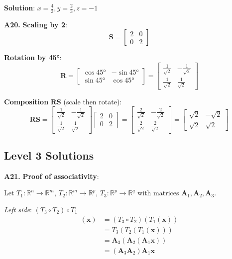 \documentclass[12pt,a4paper]{article}
\theoremstyle{definition}
\begin{document}
\textbf{Solution}: $x = \frac{4}{3}, y = \frac{2}{3}, z = -1$

\textbf{A20.} \textbf{Scaling by 2}:
\[
\mathbf{S} = \begin{bmatrix} 2 & 0 \\ 0 & 2 \end{bmatrix}
\]

\textbf{Rotation by 45°}:
\[
\mathbf{R} = \begin{bmatrix} \cos 45° & -\sin 45° \\ \sin 45° & \cos 45° \end{bmatrix} = \begin{bmatrix} \frac{1}{\sqrt{2}} & -\frac{1}{\sqrt{2}} \\ \frac{1}{\sqrt{2}} & \frac{1}{\sqrt{2}} \end{bmatrix}
\]

\textbf{Composition} $\mathbf{RS}$ (scale then rotate):
\[
\mathbf{RS} = \begin{bmatrix} \frac{1}{\sqrt{2}} & -\frac{1}{\sqrt{2}} \\ \frac{1}{\sqrt{2}} & \frac{1}{\sqrt{2}} \end{bmatrix} \begin{bmatrix} 2 & 0 \\ 0 & 2 \end{bmatrix} = \begin{bmatrix} \frac{2}{\sqrt{2}} & -\frac{2}{\sqrt{2}} \\ \frac{2}{\sqrt{2}} & \frac{2}{\sqrt{2}} \end{bmatrix} = \begin{bmatrix} \sqrt{2} & -\sqrt{2} \\ \sqrt{2} & \sqrt{2} \end{bmatrix}
\]

\subsection{Level 3 Solutions}

\textbf{A21.} \textbf{Proof of associativity}:

Let $T_1: \mathbb{R}^n \to \mathbb{R}^m$, $T_2: \mathbb{R}^m \to \mathbb{R}^p$, $T_3: \mathbb{R}^p \to \mathbb{R}^q$ with matrices $\mathbf{A}_1, \mathbf{A}_2, \mathbf{A}_3$.

\textit{Left side}: $(T_3 \circ T_2) \circ T_1$
\begin{align*}
[(T_3 \circ T_2) \circ T_1](\mathbf{x}) &= (T_3 \circ T_2)(T_1(\mathbf{x})) \\
&= T_3(T_2(T_1(\mathbf{x}))) \\
&= \mathbf{A}_3(\mathbf{A}_2(\mathbf{A}_1\mathbf{x})) \\
&= (\mathbf{A}_3\mathbf{A}_2)\mathbf{A}_1\mathbf{x}
\end{align*}
\end{document}
